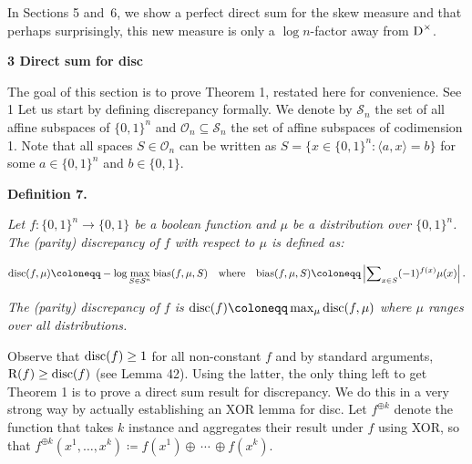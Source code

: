 In Sections 5 and 6, we show a perfect direct sum for the skew measure and that perhaps surprisingly, this new measure is only a $\log n$-factor away from ${\textup{D}}^{\times}$.\par






\par\medskip\noindent\textbf{
3 Direct sum for disc
}\par




The goal of this section is to prove Theorem 1, restated here for convenience.
See 1
Let us start by defining discrepancy formally. We denote by $\mathcal{S}_{n}$ the set of all affine subspaces of $\{0,1\}^{n}$ and $\mathcal{O}_{n}\subseteq\mathcal{S}_{n}$ the set of affine subspaces of codimension 1. Note that all spaces $S\in\mathcal{O}_{n}$ can be written as $S=\{x\in\{0,1\}^{n}:\langle a,x\rangle=b\}$ for some $a\in\{0,1\}^{n}$ and $b\in\{0,1\}$.\par





\par\medskip\noindent\textbf{
\textbf{Definition 7}\textbf{.}
}\par



\emph{Let $f\colon\{0,1\}^{n}\to\{0,1\}$ be a boolean function and $\mu$ be a distribution over $\{0,1\}^{n}$. The (parity) discrepancy of $f$ with respect to $\mu$ is defined as:}\par


\[\begin{gathered}
{\textup{disc}}(f,\mu)\coloneqq-\log\max_{S\in\mathcal{S}^{n}}{\textup{bias}}(f,\mu,S)\quad\text{where}\quad{\textup{bias}}(f,\mu,S)\coloneqq\left|\sum\nolimits_{x\in S}(-1)^{f(x)}\mu(x)\right|.
\end{gathered}\]


\emph{The (parity) discrepancy of $f$ is ${\textup{disc}}(f)\coloneqq\max_{\mu}{\textup{disc}}(f,\mu)$ where $\mu$ ranges over all distributions.}\par






Observe that ${\textup{disc}}(f)\geq 1$ for all non-constant $f$ and by standard arguments, ${\textup{R}}(f)\geq{\textup{disc}}(f)$ (see Lemma 42). Using the latter, the only thing left to get Theorem 1 is to prove a direct sum result for discrepancy. We do this in a very strong way by actually establishing an XOR lemma for disc. Let $f^{\oplus k}$ denote the function that takes $k$ instance and aggregates their result under $f$ using XOR, so that $f^{\oplus k}(x^{1},\dots,x^{k})\coloneqq f(x^{1})\oplus\,\cdots\,\oplus f(x^{k})$.\par




